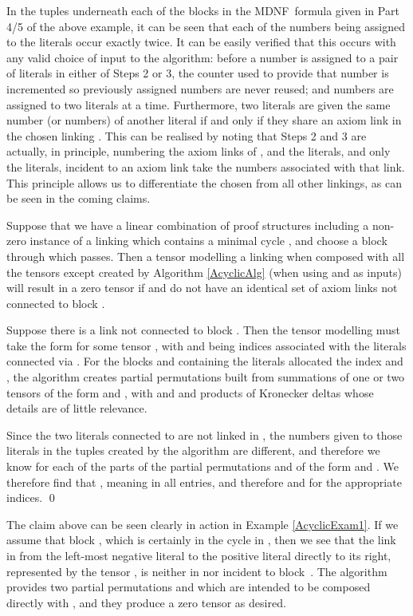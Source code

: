 \documentclass{LMCS}
\theoremstyle{plain}\newtheorem*{cLm}{Claim}
\newcommand{\p}{} \newcommand{\N}{\mathbb{N}}
\begin{document}
\noindent In the tuples underneath each of the blocks in the MDNF~formula given in Part 4/5 of the above example, it can be seen that each of the numbers being assigned to the literals occur exactly twice. It can be easily verified that this occurs with any valid choice of input to the algorithm: before a number is assigned to a pair of literals in either of Steps 2 or 3, the counter used to provide that number is incremented so previously assigned numbers are never reused; and numbers are assigned to two literals at a time. Furthermore, two literals are given the same number (or numbers) of another literal if and only if they share an axiom link in the chosen linking . This can be realised by noting that Steps 2 and 3 are actually, in principle, numbering the axiom links of , and the literals, and only the literals, incident to an axiom link take the numbers associated with that link. This principle allows us to differentiate the chosen  from all other linkings, as can be seen in the coming claims. 

\begin{lem} \label{AcyclicClaim1}
Suppose that we have a linear combination of proof structures including a non-zero instance of a linking  which contains a minimal cycle , and choose a block  through which  passes. Then a tensor modelling a linking  when composed with all the tensors except  created by Algorithm \ref{AcyclicAlg} (when using  and  as inputs) will result in a zero tensor if  and  do not have an identical set of axiom links not connected to block .
\end{lem}
\proof
Suppose there is a link  not connected to block . Then the tensor modelling  must take the form  for some tensor , with  and  being indices associated with the literals connected via . For the blocks  and  containing the literals allocated the index  and , the algorithm creates partial permutations built from summations of one or two tensors of the form  and , with  and  and  products of Kronecker deltas whose details are of little relevance.

\p Since the two literals connected to  are not linked in , the numbers given to those literals in the tuples created by the algorithm are different, and therefore we know  for each of the parts of the partial permutations  and  of the form  and . We therefore find that , meaning  in all entries, and therefore  and  for the appropriate indices. \qed

The claim above can be seen clearly in action in Example \ref{AcyclicExam1}. If we assume that block , which is certainly in the cycle  in , then we see that the link in  from the left-most negative literal to the positive literal directly to its right, represented by the tensor , is neither in  nor incident to block~. The algorithm provides two partial permutations  and  which are intended to be composed directly with , and they produce a zero tensor as desired.
\end{document}
